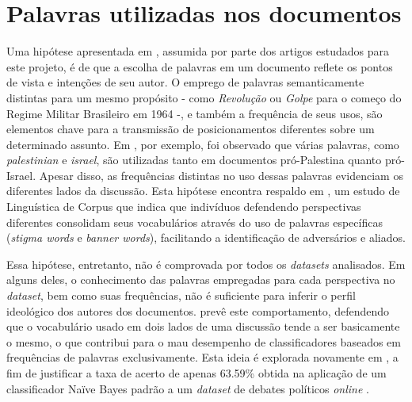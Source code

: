 \section{Palavras utilizadas nos documentos}

Uma hipótese apresentada em \cite{lin-et-al2006}, assumida por parte dos artigos estudados para este projeto, é de que a escolha de palavras em um documento reflete os pontos de vista e intenções de seu autor. O emprego de palavras semanticamente distintas para um mesmo propósito - como \emph{Revolução} ou \emph{Golpe} para o começo do Regime Militar Brasileiro em 1964 -, e também a frequência de seus usos, são elementos chave para a transmissão de posicionamentos diferentes sobre um determinado assunto. Em \cite{lin-et-al2006}, por exemplo, foi observado que várias palavras, como \emph{palestinian} e \emph{israel}, são utilizadas tanto em documentos pró-Palestina quanto pró-Israel. Apesar disso, as frequências distintas no uso dessas palavras evidenciam os diferentes lados da discussão. Esta hipótese encontra respaldo em \cite{teubert2001}, um estudo de Linguística de Corpus \cite{biber-d1998}\cite{halliday2004} que indica que indivíduos defendendo perspectivas diferentes consolidam seus vocabulários através do uso de palavras específicas (\emph{stigma words} e \emph{banner words}), facilitando a identificação de adversários e aliados. 

Essa hipótese, entretanto, não é comprovada por todos os \emph{datasets} analisados. Em alguns deles, o conhecimento das palavras empregadas para cada perspectiva no \emph{dataset}, bem como suas frequências, não é suficiente para inferir o perfil ideológico dos autores dos documentos. \cite{agrawal2003} prevê este comportamento, defendendo que o vocabulário usado em dois lados de uma discussão tende a ser basicamente o mesmo, o que contribui para o mau desempenho de classificadores baseados em frequências de palavras exclusivamente. Esta ideia é explorada novamente em \cite{malouf-taking_sides}, a fim de justificar a taxa de acerto de apenas 63.59\% obtida na aplicação de um classificador Naïve Bayes padrão a um \emph{dataset} de debates políticos \emph{online} \cite{www-politics-org}.

